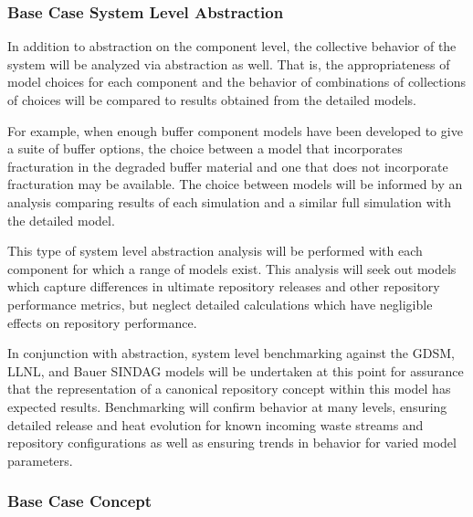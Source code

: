 \subsubsection{Base Case System Level Abstraction}


In addition to abstraction on the component level, the collective behavior of 
the system will be analyzed via abstraction as well. That is, the
appropriateness of model choices for each component and the behavior of 
combinations of collections of choices will be compared to results obtained from 
the detailed models. 


For example, when enough buffer component models have been developed to give a 
suite of buffer options, the choice between a model that incorporates
fracturation in the degraded buffer material and one that does not incorporate 
fracturation may be available.  The choice between models will be informed by an 
analysis comparing results of each simulation and a similar full simulation with  
the detailed model.


This type of system level abstraction analysis will be performed with each 
component for which a range of models exist. This analysis will seek out models 
which capture differences in ultimate repository releases and other repository 
performance metrics, but neglect detailed calculations which have negligible effects
on repository performance.


In conjunction with abstraction, system level benchmarking against the \gls{GDSM}, 
\gls{LLNL}, and Bauer \gls{SINDAG} models will be undertaken at this point for 
assurance that the representation of a canonical repository concept within this  
model has expected results. Benchmarking will confirm behavior at many levels, 
ensuring detailed release and heat evolution for known incoming waste streams
and repository configurations as well as ensuring trends in behavior for 
varied model parameters.

\subsubsection{Base Case Concept}

